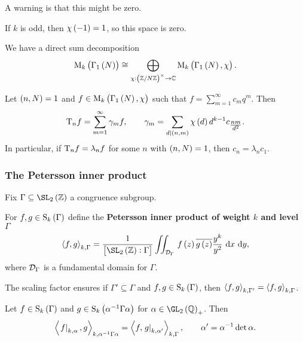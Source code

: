 A warning is that this might be zero.

\begin{example*}
If $ k $ is odd, then $ \chi\br{-1} = 1 $, so this space is zero.
\end{example*}

We have a direct sum decomposition
$$ \M_k\br{\Gamma_1\br{N}} \cong \bigoplus_{\chi : \br{\ZZ / N\ZZ}^\times \to \CC} \M_k\br{\Gamma_1\br{N}, \chi}. $$

\begin{proposition}
Let $ \br{n, N} = 1 $ and $ f \in \M_k\br{\Gamma_1\br{N}, \chi} $ such that $ f = \sum_{m = 1}^\infty c_mq^m $. Then
$$ \T_nf = \sum_{m = 1}^\infty \gamma_mf, \qquad \gamma_m = \sum_{d \mid \br{n, m}} \chi\br{d}d^{k - 1}c_{\tfrac{nm}{d^2}}. $$
In particular, if $ \mathrm{T}_nf = \lambda_nf $ for some $ n $ with $ \br{n, N} = 1 $, then $ c_n = \lambda_nc_1 $.
\end{proposition}

\pagebreak

\subsubsection{The Petersson inner product}

Fix $ \Gamma \subseteq \SL_2\br{\ZZ} $ a congruence subgroup.

\begin{definition}
For $ f, g \in \S_k\br{\Gamma} $ define the \textbf{Petersson inner product of weight $ k $ and level $ \Gamma $}
$$ \abr{f, g}_{k, \Gamma} = \dfrac{1}{\sbr{\SL_2\br{\ZZ} : \Gamma}}\iintd{\DDD_\Gamma}{f\br{z}\overline{g\br{z}}\dfrac{y^k}{y^2}}{x}{y}, $$
where $ \mathcal{D}_\Gamma $ is a fundamental domain for $ \Gamma $.
\end{definition}

\begin{note*}
The scaling factor ensures if $ \Gamma' \subseteq \Gamma $ and $ f, g \in \S_k\br{\Gamma} $, then $ \left\langle f, g \right\rangle_{k, \Gamma'} = \left\langle f, g \right\rangle_{k, \Gamma} $.
\end{note*}

\begin{proposition}
Let $ f \in \S_k\br{\Gamma} $ and $ g \in \S_k\br{\alpha^{-1}\Gamma\alpha} $ for $ \alpha \in \GL_2\br{\QQ}_+ $. Then
$$ \left\langle \left. f \right|_{k, \alpha}, g \right\rangle_{k, \alpha^{-1}\Gamma\alpha} = \left\langle f, \left. g \right|_{k, \alpha'} \right\rangle_{k, \Gamma}, \qquad \alpha' = \alpha^{-1}\det \alpha. $$
\end{proposition}

